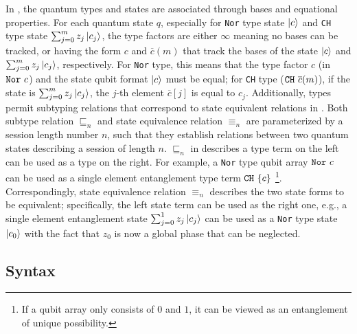 In \qafny, the quantum types and states are associated through bases and equational properties.
For each quantum state $q$, especially for \texttt{Nor} type state $\left\vert{c}\right\rangle$ and \texttt{CH} type state $\sum_{j=0}^{m}{z_j\left\vert{c_j}\right\rangle}$, the type factors are either $\infty$ meaning no bases can be tracked, or having the form $c$ and $\overline{c}(m)$ that track the bases of the state $\left\vert{c}\right\rangle$ and $\sum_{j=0}^{m}{z_j\left\vert{c_j}\right\rangle}$, respectively. For \texttt{Nor} type, this means that the type factor $c$ (in $\texttt{Nor}~{c}$) and the state qubit format $\left\vert{c}\right\rangle$ must be equal; for \texttt{CH} type ($\texttt{CH}~{\overline{c}(m)}$), if the state is $\sum_{j=0}^{m}{z_j\left\vert{c_j}\right\rangle}$, the $j$-th element $\overline{c}[j]$ is equal to $c_j$.
Additionally, \qafny types permit subtyping relations that correspond to state equivalent relations in . 
Both subtype relation $\sqsubseteq_n$ and state equivalence relation $\equiv_n$ are parameterized by a session length number $n$, such that they establish relations between two quantum states describing a session of length $n$.
$\sqsubseteq_n$ in  describes a type term on the left can be used as a type on the right. For example, a \texttt{Nor} type qubit array $\texttt{Nor}~{c}$ can be used as a single element entanglement type term $\texttt{CH}~{\{c\}}$ \footnote{If a qubit array only consists of $0$ and $1$, it can be viewed as an entanglement of unique possibility. }. 
Correspondingly, state equivalence relation $\equiv_n$ describes the two state forms to be equivalent; specifically, the left state term can be used as the right one, e.g., a single element entanglement state $\sum_{j=0}^{1}{z_j\left\vert{c_j}\right\rangle}$ can be used as a \texttt{Nor} type state $\left\vert{c_0}\right\rangle$ with the fact that $z_0$ is now a global phase that can be neglected.

\subsection{Syntax}

